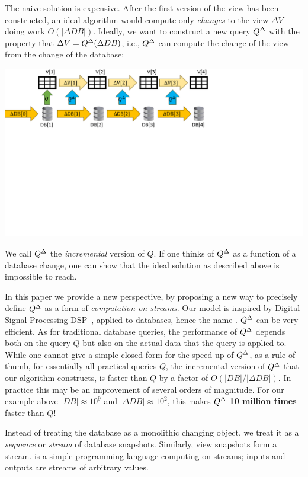 The naive solution is expensive.  After the first version of the view
has been constructed, an ideal algorithm would compute only
\emph{changes} to the view $\Delta V$ doing work $O(|\Delta DB|)$.
Ideally, we want to construct a new query ${Q}^{\Delta}$ with the property
that $\Delta V = {Q}^{\Delta}(\Delta DB)$, i.e., ${Q}^{\Delta}$ can compute the
change of the view from the change of the database:

\includegraphics[trim={0 4.7in 4.1in 0},clip,scale=.30]{incview.pdf}

We call ${Q}^{\Delta}$ the \emph{incremental} version of $Q$.  If one
thinks of ${Q}^{\Delta}$ as a function of a database change, one can show
that the ideal solution as described above is impossible to reach.

In this paper we provide a new perspective, by proposing a new way to
precisely define ${Q}^{\Delta}$ as a form of \emph{computation on streams}.
Our model is inspired by Digital Signal Processing
DSP~\cite{rabiner-book75}, applied to databases, hence the name \dbsp.
${Q}^{\Delta}$ can be very efficient.  As for traditional database queries,
the performance of ${Q}^{\Delta}$ depends both on the query $Q$ but also on
the actual data that the query is applied to.  While one cannot give a
simple closed form for the speed-up of ${Q}^{\Delta}$, as a rule of thumb,
for essentially all practical queries $Q$, the incremental version of
${Q}^{\Delta}$ that our algorithm constructs, is faster than $Q$ by a
factor of $O(|DB| / |\Delta DB|)$.  In practice this may be an
improvement of several orders of magnitude.  For our example above
$|DB| \approx 10^9$ and $|\Delta DB| \approx 10^2$, this makes
${Q}^{\Delta}$ \textbf{10 million times} faster than $Q$!

Instead of treating the database as a monolithic changing object, we
treat it as a \emph{sequence} or \emph{stream} of database snapshots.
Similarly, view snapshots form a stream.  \dbsp is a simple
programming language computing on streams; inputs and outputs are
streams of arbitrary values.

